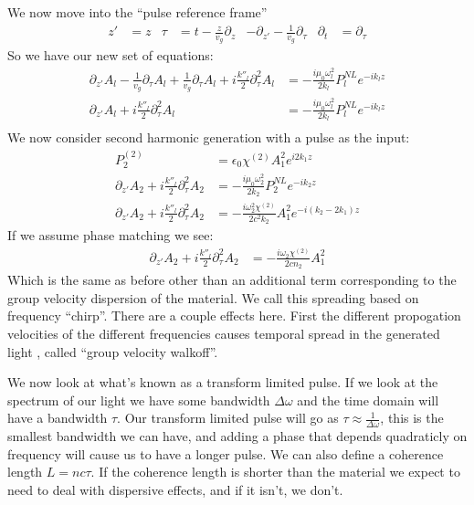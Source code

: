 We now move into the ``pulse reference frame''
\begin{align*}
	z' &= z & \tau &= t- \frac{z}{v_g}
	\partial_z &- \partial_{z'} -\frac{1}{v_g}\partial_\tau & \partial_t &= \partial_\tau
\end{align*}
So we have our new set of equations:
\begin{align*}
	\partial_{z'} A_l - \frac{1}{v_g} \partial_\tau A_l + \frac{1}{v_g}\partial_\tau A_l + i\frac{k''_l}{2}\partial_\tau^2 A_l &= -\frac{i\mu_0\omega_l^2}{2k_l}P_l^{NL} e^{-ik_l z} \\
	\partial_{z'} A_l + i\frac{k''_l}{2}\partial_\tau^2 A_l &= -\frac{i\mu_0\omega_l^2}{2k_l}P_l^{NL} e^{-ik_l z} \\
\end{align*}
We now consider second harmonic generation with a pulse as the input:
\begin{align*}
	P_2^{(2)} &= \epsilon_0\chi^{(2)} A_1^2 e^{i2k_1 z} \\
	\partial_{z'} A_2 + i\frac{k''_l}{2}\partial_\tau^2 A_2 &= -\frac{i\mu_0\omega_2^2}{2k_2}P_2^{NL} e^{-ik_2 z} \\
	\partial_{z'} A_2 + i\frac{k''_l}{2}\partial_\tau^2 A_2 &= -\frac{i\omega_2^2\chi^{(2)}}{2c^2k_2}A_1^2 e^{-i(k_2-2k_1)z}
\end{align*}
If we assume phase matching we see:
\begin{align*}
	\partial_{z'} A_2 + i\frac{k''_l}{2}\partial_\tau^2 A_2 &= -\frac{i\omega_2\chi^{(2)}}{2cn_2}A_1^2
\end{align*}
Which is the same as before other than an additional term corresponding to the group velocity dispersion of the material. We call this spreading based on frequency ``chirp''.
There are a couple effects here. First the different propogation velocities of the different frequencies causes temporal spread in the generated light , called ``group velocity walkoff''.

We now look at what's known as a transform limited pulse. If we look at the spectrum of our light we have some bandwidth $\Delta\omega$ and the time domain will have a bandwidth $\tau$.
Our transform limited pulse will go as $\tau \approx \frac{1}{\Delta\omega}$, this is the smallest bandwidth we can have, and adding a phase that depends quadraticly on frequency will cause us to have a longer pulse.
We can also define a coherence length $L = nc\tau$. If the coherence length is shorter than the material we expect to need to deal with dispersive effects, and if it isn't, we don't.

